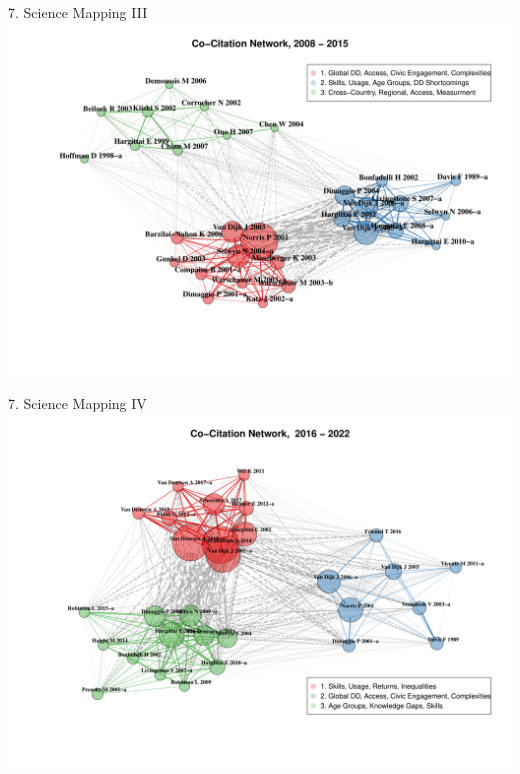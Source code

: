 \documentclass[
  ignorenonframetext,
]{beamer}
\begin{document}
\begin{frame}{7. Science Mapping III}
\protect\hypertarget{science-mapping-iii}{}
\includegraphics{Presentation_bibliometric_Madrid_june_20_files/figure-beamer/Co_cite_P2-1.pdf}
\end{frame}

\begin{frame}{7. Science Mapping IV}
\protect\hypertarget{science-mapping-iv}{}
\includegraphics{Presentation_bibliometric_Madrid_june_20_files/figure-beamer/Co_cite_P3-1.pdf}
\end{frame}
\end{document}
